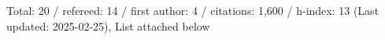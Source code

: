 Total: 20 / refereed: 14 / first author: 4 / citations: 1,600 / h-index: 13 (Last updated: 2025-02-25), List attached below